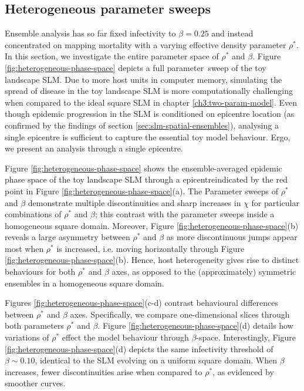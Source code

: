 \subsection{Heterogeneous parameter sweeps}

Ensemble analysis has so far fixed infectivity to $\beta=0.25$
and instead concentrated on mapping mortality with a varying effective density parameter $\rho^*$.
In this section, we investigate the entire parameter space of $\rho^*$ and $\beta$.
Figure \ref{fig:heterogeneous-phase-space} depicts a full parameter sweep of the toy landscape SLM.
Due to more host units in computer memory, simulating the spread of disease in the toy landscape SLM is more 
computationally challenging when compared to the ideal square SLM in chapter \ref{ch3:two-param-model}.
Even though epidemic progression in the SLM is conditioned on epicentre location (as confirmed by the findings of section \ref{sec:slm-spatial-ensembles}),
analysing a single epicentre is sufficient to capture the essential toy model behaviour.
Ergo, we present an analysis through a single epicentre.

Figure \ref{fig:heterogeneous-phase-space} shows the ensemble-averaged epidemic phase space of the toy landscape SLM
through a epicentre\textemdash indicated by the red point in Figure \ref{fig:heterogeneous-phase-space}(a).
The Parameter sweeps of $\rho^{*}$ and $\beta$ demonstrate multiple discontinuities and sharp increases in $\chi$
for particular combinations of $\rho^{*}$ and $\beta$; this contrast with the parameter sweeps inside a homogeneous square domain.
Moreover, Figure \ref{fig:heterogeneous-phase-space}(b) reveals a large asymmetry between $\rho^*$ and $\beta$ 
as more discontinuous jumps appear most when $\rho^*$ is increased, i.e. moving horizontally 
through Figure \ref{fig:heterogeneous-phase-space}(b). Hence, host heterogeneity gives rise to distinct behaviours for both
$\rho^*$ and $\beta$ axes, as opposed to the (approximately) symmetric ensembles in a homogeneous square domain.  

Figures \ref{fig:heterogeneous-phase-space}(c-d) contrast behavioural differences between 
$\rho^*$ and $\beta$ axes. Specifically, we compare one-dimensional slices through both parameters $\rho^*$ and $\beta$.
Figure \ref{fig:heterogeneous-phase-space}(d) details how variations of $\rho^*$ effect the model behaviour through $\beta$-space. 
Interestingly, Figure \ref{fig:heterogeneous-phase-space}(d) depicts the same infectivity threshold of $\beta\sim0.10$, 
identical to the SLM evolving on a uniform square domain. When $\beta$ increases, fewer discontinuities arise when
compared to $\rho^*$, as evidenced by smoother curves. 

